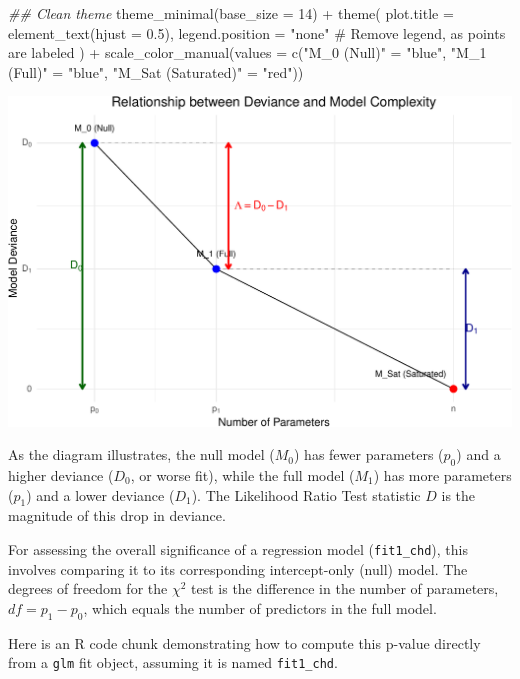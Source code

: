 \documentclass[
  letterpaper,
]{scrbook}
\newenvironment{Shaded}{\begin{snugshade}}{\end{snugshade}}
\newcommand{\AttributeTok}[1]{\textcolor[rgb]{0.40,0.45,0.13}{#1}}
\newcommand{\CommentTok}[1]{\textcolor[rgb]{0.37,0.37,0.37}{#1}}
\newcommand{\DecValTok}[1]{\textcolor[rgb]{0.68,0.00,0.00}{#1}}
\newcommand{\DocumentationTok}[1]{\textcolor[rgb]{0.37,0.37,0.37}{\textit{#1}}}
\newcommand{\FloatTok}[1]{\textcolor[rgb]{0.68,0.00,0.00}{#1}}
\newcommand{\FunctionTok}[1]{\textcolor[rgb]{0.28,0.35,0.67}{#1}}
\newcommand{\NormalTok}[1]{\textcolor[rgb]{0.00,0.23,0.31}{#1}}
\newcommand{\OtherTok}[1]{\textcolor[rgb]{0.00,0.23,0.31}{#1}}
\newcommand{\SpecialCharTok}[1]{\textcolor[rgb]{0.37,0.37,0.37}{#1}}
\newcommand{\StringTok}[1]{\textcolor[rgb]{0.13,0.47,0.30}{#1}}
\begin{document}
\begin{Shaded}
\begin{Highlighting}[]
  \DocumentationTok{\#\# Clean theme}
  \FunctionTok{theme\_minimal}\NormalTok{(}\AttributeTok{base\_size =} \DecValTok{14}\NormalTok{) }\SpecialCharTok{+}
  \FunctionTok{theme}\NormalTok{(}
    \AttributeTok{plot.title =} \FunctionTok{element\_text}\NormalTok{(}\AttributeTok{hjust =} \FloatTok{0.5}\NormalTok{),}
    \AttributeTok{legend.position =} \StringTok{"none"} \CommentTok{\# Remove legend, as points are labeled}
\NormalTok{  ) }\SpecialCharTok{+}
  \FunctionTok{scale\_color\_manual}\NormalTok{(}\AttributeTok{values =} \FunctionTok{c}\NormalTok{(}\StringTok{"M\_0 (Null)"} \OtherTok{=} \StringTok{"blue"}\NormalTok{, }\StringTok{"M\_1 (Full)"} \OtherTok{=} \StringTok{"blue"}\NormalTok{, }\StringTok{"M\_Sat (Saturated)"} \OtherTok{=} \StringTok{"red"}\NormalTok{))}
\end{Highlighting}
\end{Shaded}

\includegraphics{unit4-lr/logistic_files/figure-pdf/unnamed-chunk-6-1.pdf}

As the diagram illustrates, the null model (\(M_0\)) has fewer
parameters (\(p_0\)) and a higher deviance (\(D_0\), or worse fit),
while the full model (\(M_1\)) has more parameters (\(p_1\)) and a lower
deviance (\(D_1\)). The Likelihood Ratio Test statistic \(D\) is the
magnitude of this drop in deviance.

For assessing the overall significance of a regression model
(\texttt{fit1\_chd}), this involves comparing it to its corresponding
intercept-only (null) model. The degrees of freedom for the \(\chi^2\)
test is the difference in the number of parameters, \(df = p_1 - p_0\),
which equals the number of predictors in the full model.

Here is an R code chunk demonstrating how to compute this p-value
directly from a \texttt{glm} fit object, assuming it is named
\texttt{fit1\_chd}.
\end{document}

